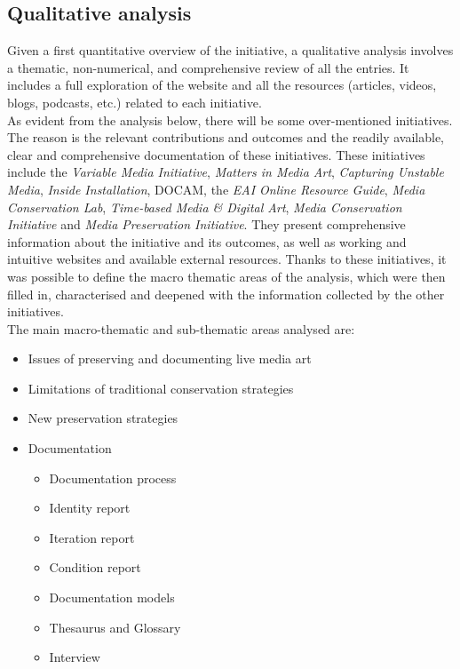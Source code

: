 \subsection{Qualitative analysis}
Given a first quantitative overview of the initiative, a qualitative analysis involves a thematic, non-numerical, and comprehensive review of all the entries. It includes a full exploration of the website and all the resources (articles, videos, blogs, podcasts, etc.) related to each initiative.\\
As evident from the analysis below, there will be some over-mentioned initiatives. The reason is the relevant contributions and outcomes and the readily available, clear and comprehensive documentation of these initiatives. These initiatives include the \textit{Variable Media Initiative}, \textit{Matters in Media Art}, \textit{Capturing Unstable Media}, \textit{Inside Installation}, DOCAM, the \textit{EAI Online Resource Guide}, \textit{Media Conservation Lab}, \textit{Time-based Media \& Digital Art}, \textit{Media Conservation Initiative} and \textit{Media Preservation Initiative}. They present comprehensive information about the initiative and its outcomes, as well as working and intuitive websites and available external resources. Thanks to these initiatives, it was possible to define the macro thematic areas of the analysis, which were then filled in, characterised and deepened with the information collected by the other initiatives.\\
The main macro-thematic and sub-thematic areas analysed are:
\begin{itemize}
    \item Issues of preserving and documenting live media art
    \item Limitations of traditional conservation strategies
    \item New preservation strategies
    \item Documentation
    \begin{itemize}
        \item Documentation process
        \item Identity report
        \item Iteration report
        \item Condition report
        \item Documentation models
        \item Thesaurus and Glossary
        \item Interview
    \end{itemize}
\end{itemize}
